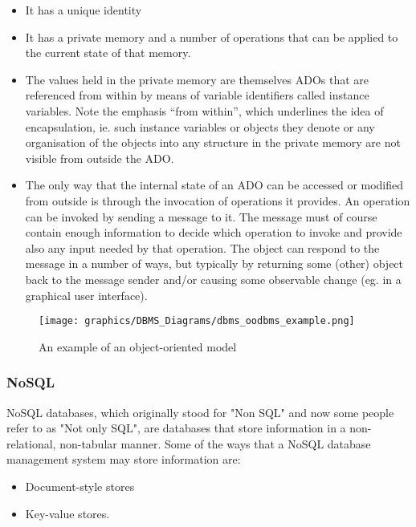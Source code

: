 \documentclass[letterpaper, 12pt]{article}
\begin{document}
\begin{itemize}
  \item It has a unique identity
  \item It has a private memory and a number of operations that can be applied to the current state of that memory. 
  \item The values held in the private memory are themselves ADOs that are referenced from
within by means of variable identifiers called instance variables. Note the emphasis
“from within”, which underlines the idea of encapsulation, ie. such instance variables
or objects they denote or any organisation of the objects into any structure in the
private memory are not visible from outside the ADO.
  \item The only way that the internal state of an ADO can be accessed or modified from
outside is through the invocation of operations it provides. An operation can be
invoked by sending a message to it. The message must of course contain enough
information to decide which operation to invoke and provide also any input needed
by that operation. The object can respond to the message in a number of ways, but
typically by returning some (other) object back to the message sender and/or causing
some observable change (eg. in a graphical user interface).
\end{itemize} \cite{object_oriented_data_model}

\begin{figure}
  \centering
  \texttt{[image: graphics/DBMS\_Diagrams/dbms\_oodbms\_example.png]}
  \caption{An example of an object-oriented model}
\end{figure}

\subsubsection{NoSQL}
NoSQL databases, which originally stood for "Non SQL" and now some people refer to as 
"Not only SQL", are databases that store information in a non-relational, non-tabular
manner. Some of the ways that a NoSQL database management system may store information are: 

\begin{itemize}
  \item Document-style stores
  \item Key-value stores.
\end{itemize}
\end{document}
